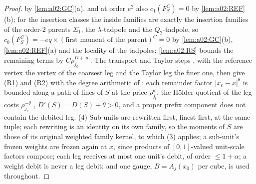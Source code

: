 \begin{proof}
by \cref{lem:a02:GC}(a), and at order $e^2$ also $c_1(F^C_S)=0$ by \cref{lem:a02:REF}(b); for the insertion classes the inside families are exactly the insertion families of the order-$2$ parents $\Sigma_1$, the $\lambda$-tadpole and the $Q_2$-tadpole, so $c_0(F^C_S)=-eq\times(\text{first moment of the parent})^C=0$ by \cref{lem:a02:GC}(b), \cref{lem:a02:REF}(a) and the locality of the tadpoles; \cref{lem:a02:RS} bounds the remaining terms by $C\rho_{j_0}^{D+|a|}$. The transport and Taylor steps \cite[(3.10), (3.34)]{Ba3}, with the reference vertex the vertex of the coarsest leg and the Taylor leg the finer one, then give (R1) and (R2) with the degree arithmetic of \cite[Sect.~3]{Ba3}: each remainder factor $|x_e-x|^\theta$ is bounded along a path of lines of $S$ at the price $\rho_{j_l}^\theta$, the H\"older quotient of the leg costs $\rho_{j_e}^{-\theta}$ \cite[(3.65), (3.85)]{K1}, $D'(S)=D(S)+\theta>0$, and a proper prefix component does not contain the debited leg. (4) Sub-units are rewritten first, finest first, at the same tuple; each rewriting is an identity on its own family, so the moments of $S$ are those of its original weighted family kernel, to which (3) applies; a sub-unit's frozen weights are frozen again at $x$, since products of $[0,1]$-valued unit-scale factors compose; each leg receives at most one unit's debit, of order $\le1+\alpha$; a weight debit is never a leg debit; and one gauge, $B=A_j(x_0)$ per cube, is used throughout.
\end{proof}


